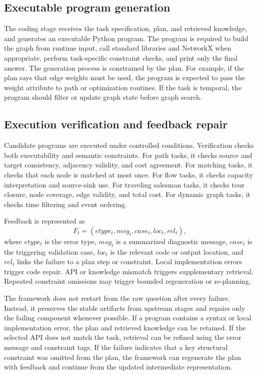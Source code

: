 \documentclass[pdflatex,sn-mathphys-num]{sn-jnl}
\theoremstyle{thmstyleone}
\theoremstyle{thmstyletwo}
\theoremstyle{thmstylethree}
\begin{document}
\subsection{Executable program generation}

The coding stage receives the task specification, plan, and retrieved knowledge, and generates an executable Python program. The program is required to build the graph from runtime input, call standard libraries and NetworkX when appropriate, perform task-specific constraint checks, and print only the final answer. The generation process is constrained by the plan. For example, if the plan says that edge weights must be used, the program is expected to pass the weight attribute to path or optimization routines. If the task is temporal, the program should filter or update graph state before graph search.

\subsection{Execution verification and feedback repair}

Candidate programs are executed under controlled conditions. Verification checks both executability and semantic constraints. For path tasks, it checks source and target consistency, adjacency validity, and cost agreement. For matching tasks, it checks that each node is matched at most once. For flow tasks, it checks capacity interpretation and source-sink use. For traveling salesman tasks, it checks tour closure, node coverage, edge validity, and total cost. For dynamic graph tasks, it checks time filtering and event ordering.

Feedback is represented as
\begin{equation}
F_t=(etype_t,msg_t,case_t,loc_t,rel_t),
\end{equation}
where $etype_t$ is the error type, $msg_t$ is a summarized diagnostic message, $case_t$ is the triggering validation case, $loc_t$ is the relevant code or output location, and $rel_t$ links the failure to a plan step or constraint. Local implementation errors trigger code repair. API or knowledge mismatch triggers supplementary retrieval. Repeated constraint omissions may trigger bounded regeneration or re-planning.

The framework does not restart from the raw question after every failure. Instead, it preserves the stable artifacts from upstream stages and repairs only the failing component whenever possible. If a program contains a syntax or local implementation error, the plan and retrieved knowledge can be retained. If the selected API does not match the task, retrieval can be refined using the error message and constraint tags. If the failure indicates that a key structural constraint was omitted from the plan, the framework can regenerate the plan with feedback and continue from the updated intermediate representation.
\end{document}
